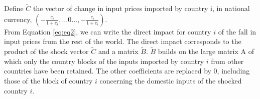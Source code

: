 \documentclass[11pt,a4paper]{article}
\begin{document}
%
%
%

Define ${{\tilde{C}}}$ the vector of change in input prices imported by country i, in national currency, 
$\left(-\frac{c_i}{1+c_i},\ldots0\ldots,-\frac{c_i}{1+c_i} \right)$. \\

From Equation \ref{eq:eq2}, we can write the direct impact for country $i$ of the fall in input prices from the rest of the world. The direct impact corresponds to the product of the shock vector ${\tilde{C}}$  and a matrix ${\tilde{B}}$. ${\tilde{B}}$ builds on the large matrix A of which only the country blocks of the inputs imported by country $i$ from other countries have been retained. The other coefficients are replaced by 0, including those of the block of country $i$ concerning the domestic inputs of the shocked country $i$. \\
\end{document}

